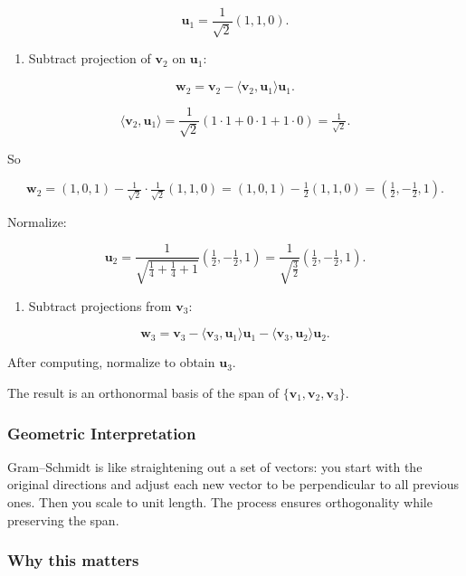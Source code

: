 \documentclass[
  12pt,
  a4paper,
]{article}
\begin{document}
\[\mathbf{u}_1 = \frac{1}{\sqrt{2}}(1,1,0).\]

\begin{enumerate}
\def\labelenumi{\arabic{enumi}.}
\item
  Subtract projection of \(\mathbf{v}_2\) on \(\mathbf{u}_1\):
\end{enumerate}

\[\mathbf{w}_2 = \mathbf{v}_2 - \langle \mathbf{v}_2,\mathbf{u}_1 \rangle \mathbf{u}_1.\]

\[\langle \mathbf{v}_2,\mathbf{u}_1 \rangle = \frac{1}{\sqrt{2}}(1\cdot 1 + 0\cdot 1 + 1\cdot 0) = \tfrac{1}{\sqrt{2}}.\]

So

\[\mathbf{w}_2 = (1,0,1) - \tfrac{1}{\sqrt{2}}\cdot \tfrac{1}{\sqrt{2}}(1,1,0) 
= (1,0,1) - \tfrac{1}{2}(1,1,0) 
= \left(\tfrac{1}{2}, -\tfrac{1}{2}, 1\right).\]

Normalize:

\[\mathbf{u}_2 = \frac{1}{\sqrt{\tfrac{1}{4}+\tfrac{1}{4}+1}} \left(\tfrac{1}{2}, -\tfrac{1}{2}, 1\right)
= \frac{1}{\sqrt{\tfrac{3}{2}}}\left(\tfrac{1}{2}, -\tfrac{1}{2}, 1\right).\]

\begin{enumerate}
\def\labelenumi{\arabic{enumi}.}
\item
  Subtract projections from \(\mathbf{v}_3\):
\end{enumerate}

\[\mathbf{w}_3 = \mathbf{v}_3 - \langle \mathbf{v}_3,\mathbf{u}_1 \rangle \mathbf{u}_1 - \langle \mathbf{v}_3,\mathbf{u}_2 \rangle \mathbf{u}_2.\]

After computing, normalize to obtain \(\mathbf{u}_3\).

The result is an orthonormal basis of the span of
\(\{\mathbf{v}_1,\mathbf{v}_2,\mathbf{v}_3\}\).

\subsubsection{Geometric
Interpretation}\label{geometric-interpretation-15}

Gram--Schmidt is like straightening out a set of vectors: you start with
the original directions and adjust each new vector to be perpendicular
to all previous ones. Then you scale to unit length. The process ensures
orthogonality while preserving the span.

\subsubsection{Why this matters}\label{why-this-matters-26}
\end{document}
